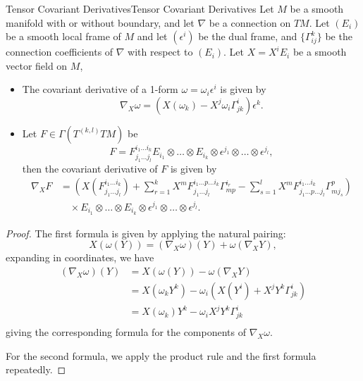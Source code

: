 \documentclass[../main.tex]{subfiles}
\begin{document}
\begin{proposition}{Tensor Covariant Derivatives}{Tensor Covariant Derivatives}
	Let $M$ be a smooth manifold with or without boundary, and let $\nabla$ be a connection on $TM$. Let $(E_i)$ be a smooth local frame of $M$ and let $(\epsilon^i)$ be the dual frame, and $\{\Gamma_{ij}^k\}$ be the connection coefficients of $\nabla$ with respect to $(E_i)$. Let $X = X^i E_i$ be a smooth vector field on $M$,
	\begin{itemize}
		\item The covariant derivative of a 1-form $\omega = \omega_i \epsilon^i$ is given by
		      \begin{equation}
			      \nabla_X \omega = (X(\omega_k) - X^j \omega_i \Gamma_{jk}^i) \epsilon^k.
		      \end{equation}
		\item Let $F \in \Gamma(T^{(k, l)} TM)$ be
		      \begin{equation}
			      F = F_{j_1 \ldots j_l}^{i_1 \ldots i_k} E_{i_1} \otimes \ldots \otimes E_{i_k} \otimes \epsilon^{j_1} \otimes \ldots \otimes \epsilon^{j_l},
		      \end{equation}
		      then the covariant derivative of $F$ is given by
		      \begin{equation}
			      \begin{aligned}
				      \nabla_X F & = \left(X(F_{j_1 \ldots j_l}^{i_1 \ldots i_k}) + \sum_{r=1}^k X^m F_{j_1 \ldots j_l}^{i_1 \ldots p \ldots i_k} \Gamma_{mp}^{i_r} - \sum_{s=1}^l X^m F_{j_1 \ldots p \ldots j_l}^{i_1 \ldots i_k} \Gamma_{mj_s}^{p}\right) \\
				                 & \quad \times E_{i_1} \otimes \ldots \otimes E_{i_k} \otimes \epsilon^{j_1} \otimes \ldots \otimes \epsilon^{j_l}.
			      \end{aligned}
		      \end{equation}
	\end{itemize}
\end{proposition}
\begin{proof}
	The first formula is given by applying the natural pairing:
	\begin{equation*}
		X(\omega(Y)) = (\nabla_X \omega)(Y) + \omega(\nabla_X Y),
	\end{equation*}
	expanding in coordinates, we have
	\begin{equation*}
		\begin{aligned}
			(\nabla_X \omega)(Y) & = X(\omega(Y)) - \omega(\nabla_X Y)                           \\
			                     & = X(\omega_k Y^k) - \omega_i (X(Y^i) + X^j Y^k \Gamma_{jk}^i) \\
			                     & = X(\omega_k) Y^k - \omega_i X^j Y^k \Gamma_{jk}^i            \\
		\end{aligned}
	\end{equation*}
	giving the corresponding formula for the components of $\nabla_X \omega$.

	For the second formula, we apply the product rule and the first formula repeatedly.
\end{proof}
\end{document}
